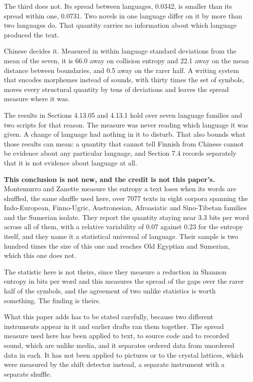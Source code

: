 The third does not. Its spread between languages, 0.0342, is smaller than its spread within one, 0.0731. Two novels in one language differ on it by more than two languages do. That quantity carries no information about which language produced the text.

Chinese decides it. Measured in within language standard deviations from the mean of the seven, it is 66.0 away on collision entropy and 22.1 away on the mean distance between boundaries, and 0.5 away on the rarer half. A writing system that encodes morphemes instead of sounds, with thirty times the set of symbols, moves every structural quantity by tens of deviations and leaves the spread measure where it was.

The results in Sections 4.13.05 and 4.13.1 hold over seven language families and two scripts for that reason. The measure was never reading which language it was given. A change of language had nothing in it to disturb. That also bounds what those results can mean: a quantity that cannot tell Finnish from Chinese cannot be evidence about any particular language, and Section 7.4 records separately that it is not evidence about language at all.

\noindent\textbf{This conclusion is not new, and the credit is not this paper's.} Montemurro and Zanette \cite{src:Montemurro, src:Zanette} measure the entropy a text loses when its words are shuffled, the same shuffle used here, over 7077 texts in eight corpora spanning the Indo-European, Finno-Ugric, Austronesian, Afroasiatic and Sino-Tibetan families and the Sumerian isolate. They report the quantity staying near 3.3 bits per word across all of them, with a relative variability of 0.07 against 0.23 for the entropy itself, and they name it a statistical universal of language. Their sample is two hundred times the size of this one and reaches Old Egyptian and Sumerian, which this one does not.

The statistic here is not theirs, since they measure a reduction in Shannon entropy in bits per word and this measures the spread of the gaps over the rarer half of the symbols, and the agreement of two unlike statistics is worth something. The finding is theirs.

What this paper adds has to be stated carefully, because two different instruments appear in it and earlier drafts ran them together. The spread measure used here has been applied to text, to source code and to recorded sound, which are unlike media, and it separates ordered data from unordered data in each. It has not been applied to pictures or to the crystal lattices, which were measured by the shift detector instead, a separate instrument with a separate shuffle.

